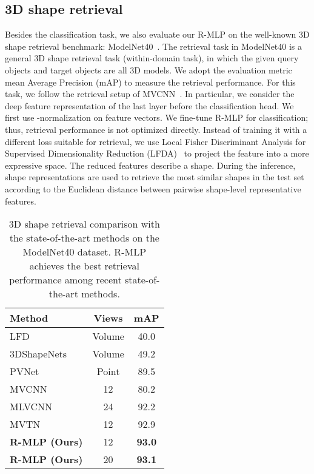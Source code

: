 \documentclass[11pt]{article}
\begin{document}
\subsection{3D shape retrieval}
Besides the classification task, we also evaluate our R-MLP on the well-known 3D shape retrieval benchmark: ModelNet40~\citep{chang2015shapenet}. The retrieval task in ModelNet40 is a general 3D shape retrieval task (within-domain task), in which the given query objects and target objects are all 3D models. We adopt the evaluation metric mean Average Precision (mAP) to measure the retrieval performance.
For this task, we follow the retrieval setup of MVCNN~\citep{su2015multi}. In particular, we consider the deep feature representation of the last layer before the classification head. We first use -normalization on feature vectors.
We fine-tune R-MLP for classification; thus, retrieval performance is not optimized directly.
Instead of training it with a different loss suitable for retrieval, we use Local Fisher Discriminant Analysis for Supervised Dimensionality Reduction (LFDA)~\citep{sugiyama2007dimensionality} to project the feature into a more expressive space.
The reduced features describe a shape. During the inference, shape representations are used to retrieve the most similar shapes in the test set according to the Euclidean distance between pairwise shape-level representative features. \\

\begin{table}[htb!]
\caption{3D shape retrieval comparison with the state-of-the-art methods on the ModelNet40 dataset. R-MLP achieves the best retrieval performance among recent state-of-the-art methods.}\label{tab:retrieval}
\centering
\begin{tabular}{lcc}
\toprule
Method & Views & mAP \\
\midrule
LFD~\citep{chen2003visual} & Volume & 40.0 \\
3DShapeNets~\citep{chang2015shapenet} & Volume & 49.2 \\
PVNet~\citep{you2018pvnet} & Point & 89.5 \\
MVCNN~\citep{su2015multi} & 12 & 80.2 \\
MLVCNN~\citep{jiang2019mlvcnn} & 24 & 92.2 \\
MVTN~\citep{hamdi2021mvtn} & 12 & 92.9 \\
\rowcolor{mygray} {\textbf{R-MLP (Ours)}} & 12 & \textbf{93.0} \\
\rowcolor{mygray} {\textbf{R-MLP (Ours)}} & 20 & \textbf{93.1} \\
\bottomrule
\end{tabular}\vspace{0.2in}
\end{table}
\end{document}
